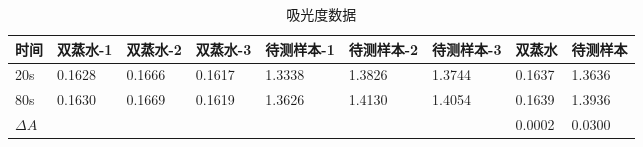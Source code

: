 \documentclass{xjtureport}
\begin{document}
\begin{table}[!htbp]
    \begin{center}
        \begin{tabular}{lllllllll}
            \toprule
            时间 & 双蒸水-1 & 双蒸水-2 & 双蒸水-3 & 待测样本-1 & 待测样本-2 & 待测样本-3 & 双蒸水 & 待测样本  \\
            \midrule
            20s  & 0.1628 & 0.1666 & 0.1617 & 1.3338 & 1.3826 & 1.3744 & 0.1637 & 1.3636  \\
            80s  & 0.1630 & 0.1669 & 0.1619 & 1.3626 & 1.4130 & 1.4054 & 0.1639 & 1.3936 \\
            $\Delta A$  &  &  &  &  &  &  & 0.0002 & 0.0300 \\
            \bottomrule
        \end{tabular}
    \end{center}
    \caption{吸光度数据}
    \label{fig:dist}
\end{table}
\end{document}

